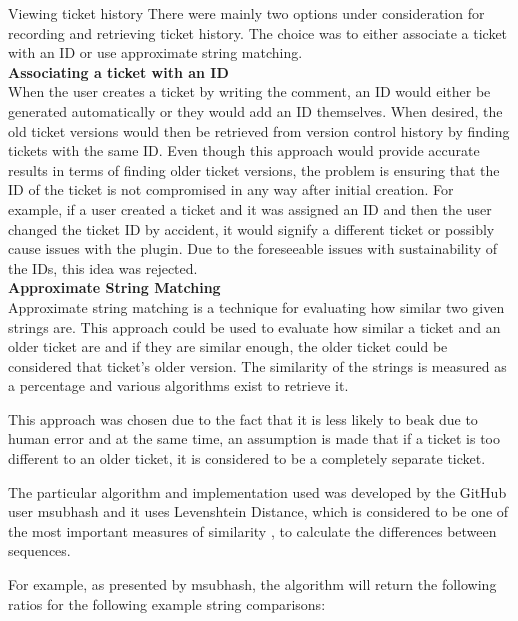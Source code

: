 \documentclass{4thYearProject}
\begin{document}
Viewing ticket history There were mainly two options under consideration for recording and retrieving ticket history. The choice was to either associate a ticket with an ID or use approximate string matching. \\
\newline
\textbf{Associating a ticket with an ID} \\
\newline
When the user creates a ticket by writing the comment, an ID would either be generated automatically or they would add an ID themselves. When desired, the old ticket versions would then be retrieved from version control history by finding tickets with the same ID.
Even though this approach would provide accurate results in terms of finding older ticket versions, the problem is ensuring that the ID of the ticket is not compromised in any way after initial creation. For example, if a user created a ticket and it was assigned an ID and then the user changed the ticket ID by accident, it would signify a different ticket or possibly cause issues with the plugin. Due to the foreseeable issues with sustainability of the IDs, this idea was rejected. 
\\
\newline
\textbf{Approximate String Matching}\\
\newline
Approximate string matching is a technique for evaluating how similar two given strings are. This approach could be used to evaluate how similar a ticket and an older ticket are and if they are similar enough, the older ticket could be considered that ticket's older version. The similarity of the strings is measured as a percentage and various algorithms exist to retrieve it. 

This approach was chosen due to the fact that it is less likely to beak due to human error and at the same time, an assumption is made that if a ticket is too different to an older ticket, it is considered to be a completely separate ticket.  

The particular algorithm and implementation used was developed by the GitHub user msubhash \cite{fuzzywuzzy} and it uses Levenshtein Distance, which is considered to be one of the most important measures of similarity \cite{tourstringmatch}, to calculate the differences between sequences. 

For example, as presented by msubhash, the algorithm will return the following ratios for the following example string comparisons:
\end{document}
